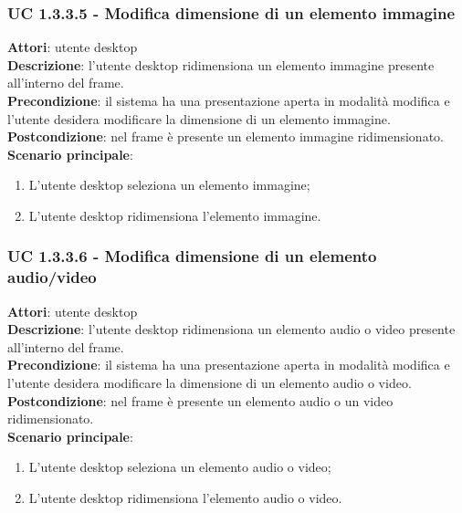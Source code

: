 \subsubsection{UC 1.3.3.5 - Modifica dimensione di un elemento immagine}{
	\label{uc1.3.3.5}
	\textbf{Attori}: utente desktop \\
	\textbf{Descrizione}: l'utente desktop ridimensiona un elemento immagine presente all'interno del frame. \\
	\textbf{Precondizione}: il sistema ha una presentazione aperta in modalità modifica e l'utente desidera modificare la dimensione di un elemento immagine.	\\
	\textbf{Postcondizione}: nel frame è presente un elemento immagine ridimensionato.	\\
	\textbf{Scenario principale}:
	\begin{enumerate}
		\item L'utente desktop seleziona un elemento immagine;
		\item L'utente desktop ridimensiona l'elemento immagine.
	\end{enumerate}
	}
\subsubsection{UC 1.3.3.6 - Modifica dimensione di un elemento audio/video}{
	\label{uc1.3.3.6}
	\textbf{Attori}: utente desktop \\
	\textbf{Descrizione}: l'utente desktop ridimensiona un elemento audio o video presente all'interno del frame. \\
	\textbf{Precondizione}: il sistema ha una presentazione aperta in modalità modifica e l'utente desidera modificare la dimensione di un elemento audio o video.	\\
	\textbf{Postcondizione}: nel frame è presente un elemento audio o un video ridimensionato.	\\
	\textbf{Scenario principale}:
	\begin{enumerate}
		\item L'utente desktop seleziona un elemento audio o video;
		\item L'utente desktop ridimensiona l'elemento audio o video.
	\end{enumerate}
	}

